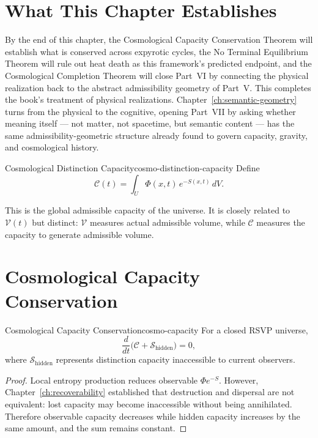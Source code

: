 \documentclass[12pt,twoside,openright]{book}
\begin{document}
\section{What This Chapter Establishes}
\label{sec:ch19-preview}

By the end of this chapter, the Cosmological Capacity
Conservation Theorem will establish what is conserved across
expyrotic cycles, the No Terminal Equilibrium Theorem will
rule out heat death as this framework's predicted endpoint,
and the Cosmological Completion Theorem will close Part~VI by
connecting the physical realization back to the abstract
admissibility geometry of Part~V. This completes the book's
treatment of physical realizations.
Chapter~\ref{ch:semantic-geometry} turns from the physical to
the cognitive, opening Part~VII by asking whether meaning
itself --- not matter, not spacetime, but semantic content ---
has the same admissibility-geometric structure already found
to govern capacity, gravity, and cosmological history.

\begin{definition}{Cosmological Distinction Capacity}{cosmo-distinction-capacity}
  Define
  \[
    \mathcal{C}(t) = \int_U \Phi(x,t)\, e^{-S(x,t)} \, dV.
  \]
\end{definition}

This is the global admissible capacity of the universe. It
is closely related to $\mathcal{V}(t)$ but distinct: $\mathcal{V}$
measures actual admissible volume, while $\mathcal{C}$
measures the capacity to generate admissible volume.

\section{Cosmological Capacity Conservation}
\label{sec:ch19-conservation}

\begin{theorem}{Cosmological Capacity Conservation}{cosmo-capacity}
  For a closed RSVP universe,
  \[
    \frac{d}{dt}\bigl(\mathcal{C} + \mathcal{S}_{\mathrm{hidden}}\bigr)
    = 0,
  \]
  where $\mathcal{S}_{\mathrm{hidden}}$ represents
  distinction capacity inaccessible to current observers.
\end{theorem}

\begin{proof}
  Local entropy production reduces observable $\Phi e^{-S}$.
  However, Chapter~\ref{ch:recoverability} established that
  destruction and dispersal are not equivalent: lost
  capacity may become inaccessible without being
  annihilated. Therefore observable capacity decreases
  while hidden capacity increases by the same amount, and
  the sum remains constant.
\end{proof}
\end{document}

